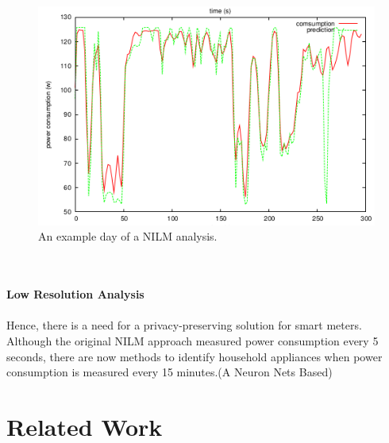 \begin{figure}[tbp]
  \centering
  \includegraphics[width=1\textwidth]{images/Fernseher.png}
  \caption[Short description]{An example day of a NILM analysis.}
  \label{fig:Nilm}
\end{figure}
\\
\\
\textbf{Low Resolution Analysis}
\\
\\
Hence, there is a need for a privacy-preserving solution for smart meters.
Although the original NILM approach measured power consumption every 5 seconds, there are now methods to identify household appliances when power consumption is measured every 15 minutes.(A Neuron Nets Based)
\section{Related Work}
